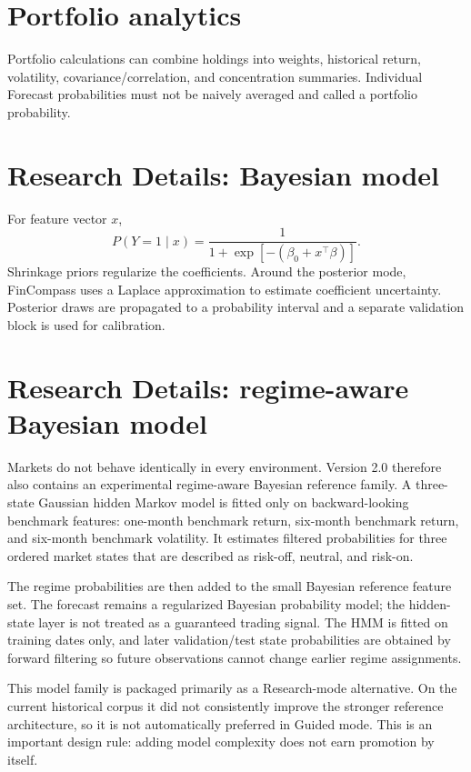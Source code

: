 \documentclass[11pt]{article}
\begin{document}
\section{Portfolio analytics}
Portfolio calculations can combine holdings into weights, historical return, volatility, covariance/correlation, and concentration summaries. Individual Forecast probabilities must not be naively averaged and called a portfolio probability.

\section{Research Details: Bayesian model}
For feature vector $x$,
\begin{equation}
P(Y=1\mid x)=\frac{1}{1+\exp[-(\beta_0+x^\top\beta)]}.
\end{equation}
Shrinkage priors regularize the coefficients. Around the posterior mode, FinCompass uses a Laplace approximation to estimate coefficient uncertainty. Posterior draws are propagated to a probability interval and a separate validation block is used for calibration.


\section{Research Details: regime-aware Bayesian model}
Markets do not behave identically in every environment. Version 2.0 therefore also contains an experimental regime-aware Bayesian reference family. A three-state Gaussian hidden Markov model is fitted only on backward-looking benchmark features: one-month benchmark return, six-month benchmark return, and six-month benchmark volatility. It estimates filtered probabilities for three ordered market states that are described as risk-off, neutral, and risk-on.

The regime probabilities are then added to the small Bayesian reference feature set. The forecast remains a regularized Bayesian probability model; the hidden-state layer is not treated as a guaranteed trading signal. The HMM is fitted on training dates only, and later validation/test state probabilities are obtained by forward filtering so future observations cannot change earlier regime assignments.

This model family is packaged primarily as a Research-mode alternative. On the current historical corpus it did not consistently improve the stronger reference architecture, so it is not automatically preferred in Guided mode. This is an important design rule: adding model complexity does not earn promotion by itself.
\end{document}
